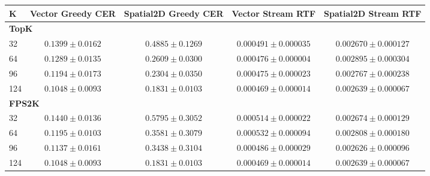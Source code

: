 \begin{tabular}{lcccc}
\toprule
K & Vector Greedy CER & Spatial2D Greedy CER & Vector Stream RTF & Spatial2D Stream RTF \\
\midrule
\midrule
\multicolumn{5}{l}{\textbf{TopK}} \\
32 & $0.1399\pm0.0162$ & $0.4885\pm0.1269$ & $0.000491\pm0.000035$ & $0.002670\pm0.000127$ \\
64 & $0.1289\pm0.0135$ & $0.2609\pm0.0300$ & $0.000476\pm0.000004$ & $0.002895\pm0.000304$ \\
96 & $0.1194\pm0.0173$ & $0.2304\pm0.0350$ & $0.000475\pm0.000023$ & $0.002767\pm0.000238$ \\
124 & $0.1048\pm0.0093$ & $0.1831\pm0.0103$ & $0.000469\pm0.000014$ & $0.002639\pm0.000067$ \\
\midrule
\multicolumn{5}{l}{\textbf{FPS2K}} \\
32 & $0.1440\pm0.0136$ & $0.5795\pm0.3052$ & $0.000514\pm0.000022$ & $0.002674\pm0.000129$ \\
64 & $0.1195\pm0.0103$ & $0.3581\pm0.3079$ & $0.000532\pm0.000094$ & $0.002808\pm0.000180$ \\
96 & $0.1137\pm0.0161$ & $0.3438\pm0.3104$ & $0.000486\pm0.000029$ & $0.002626\pm0.000096$ \\
124 & $0.1048\pm0.0093$ & $0.1831\pm0.0103$ & $0.000469\pm0.000014$ & $0.002639\pm0.000067$ \\
\bottomrule
\end{tabular}
